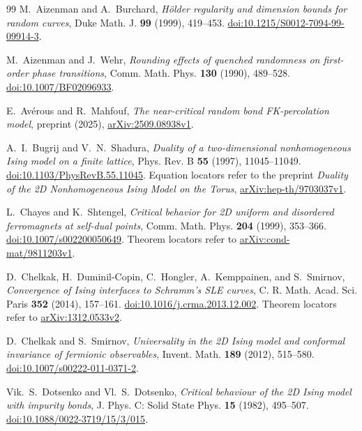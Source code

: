 \clearpage
{}
{}
\begin{thebibliography}{99}
M.~Aizenman and A.~Burchard,
\emph{H\"older regularity and dimension bounds for random curves},
Duke Math. J. \textbf{99} (1999), 419--453.
\href{https://doi.org/10.1215/S0012-7094-99-09914-3}{doi:10.1215/S0012-7094-99-09914-3}.

M.~Aizenman and J.~Wehr,
\emph{Rounding effects of quenched randomness on first-order phase transitions},
Comm. Math. Phys. \textbf{130} (1990), 489--528.
\href{https://doi.org/10.1007/BF02096933}{doi:10.1007/BF02096933}.

E.~Av\'erous and R.~Mahfouf,
\emph{The near-critical random bond FK-percolation model},
preprint (2025), \href{https://arxiv.org/abs/2509.08938v1}{arXiv:2509.08938v1}.

A.~I.~Bugrij and V.~N.~Shadura,
\emph{Duality of a two-dimensional nonhomogeneous Ising model on a finite lattice},
Phys. Rev. B \textbf{55} (1997), 11045--11049.
\href{https://doi.org/10.1103/PhysRevB.55.11045}{doi:10.1103/PhysRevB.55.11045}.
Equation locators refer to the preprint
\emph{Duality of the 2D Nonhomogeneous Ising Model on the Torus},
\href{https://arxiv.org/abs/hep-th/9703037v1}{arXiv:hep-th/9703037v1}.

L.~Chayes and K.~Shtengel,
\emph{Critical behavior for 2D uniform and disordered ferromagnets at self-dual points},
Comm. Math. Phys. \textbf{204} (1999), 353--366.
\href{https://doi.org/10.1007/s002200050649}{doi:10.1007/s002200050649}.
Theorem locators refer to \href{https://arxiv.org/abs/cond-mat/9811203v1}{arXiv:cond-mat/9811203v1}.

D.~Chelkak, H.~Duminil-Copin, C.~Hongler, A.~Kemppainen, and S.~Smirnov,
\emph{Convergence of Ising interfaces to Schramm's SLE curves},
C. R. Math. Acad. Sci. Paris \textbf{352} (2014), 157--161.
\href{https://doi.org/10.1016/j.crma.2013.12.002}{doi:10.1016/j.crma.2013.12.002}.
Theorem locators refer to \href{https://arxiv.org/abs/1312.0533v2}{arXiv:1312.0533v2}.

D.~Chelkak and S.~Smirnov,
\emph{Universality in the 2D Ising model and conformal invariance of fermionic observables},
Invent. Math. \textbf{189} (2012), 515--580.
\href{https://doi.org/10.1007/s00222-011-0371-2}{doi:10.1007/s00222-011-0371-2}.

Vik.~S.~Dotsenko and Vl.~S.~Dotsenko,
\emph{Critical behaviour of the 2D Ising model with impurity bonds},
J. Phys. C: Solid State Phys. \textbf{15} (1982), 495--507.
\href{https://doi.org/10.1088/0022-3719/15/3/015}{doi:10.1088/0022-3719/15/3/015}.


\end{thebibliography}
